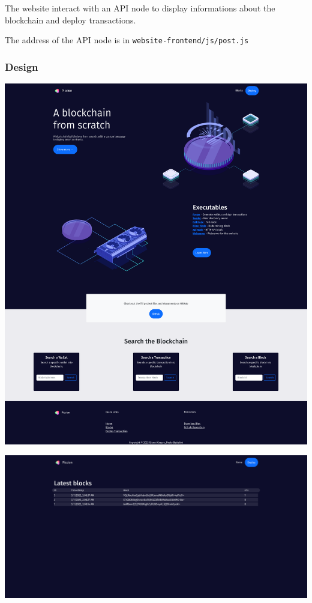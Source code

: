 \documentclass[../documentation.tex]{subfiles}
\begin{document}
The website interact with an API node to display informations about the blockchain
and deploy transactions.

The address of the API node is in \texttt{website-frontend/js/post.js}

\pagebreak

\subsubsection{Design}


\includegraphics[width=\textwidth]{images/website1}


\includegraphics[width=\textwidth]{images/website2}
\end{document}
